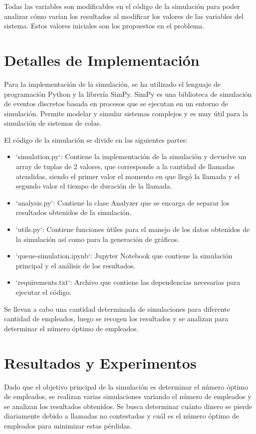 \documentclass{article}
\begin{document}
Todas las variables son modificables en el código de la simulación para poder analizar cómo varían los resultados al modificar los valores de las variables del sistema. Estos valores iniciales son los propuestos en el problema.
\section{Detalles de Implementación}

Para la implementación de la simulación, se ha utilizado el lenguaje de programación Python y la librería SimPy. SimPy es una biblioteca de simulación de eventos discretos basada en procesos que se ejecutan en un entorno de simulación. Permite modelar y simular sistemas complejos y es muy útil para la simulación de sistemas de colas.

El código de la simulación se divide en las siguientes partes:
\begin{itemize}
    \item `simulation.py`: Contiene la implementación de la simulación y devuelve un array de tuplas de 2 valores, que corresponde a la cantidad de llamadas atendidas, siendo el primer valor el momento en que llegó la llamada y el segundo valor el tiempo de duración de la llamada.
    \item `analysis.py`: Contiene la clase Analyzer que se encarga de separar los resultados obtenidos de la simulación.
    \item `utils.py`: Contiene funciones útiles para el manejo de los datos obtenidos de la simulación así como para la generación de gráficos.
    \item `queue-simulation.ipynb`: Jupyter Notebook que contiene la simulación principal y el análisis de los resultados.
    \item `requirements.txt`: Archivo que contiene las dependencias necesarias para ejecutar el código.
\end{itemize}

Se llevan a cabo una cantidad determinada de simulaciones para diferente cantidad de empleados, luego se recogen los resultados y se analizan para determinar el número óptimo de empleados.

\section{Resultados y Experimentos}
Dado que el objetivo principal de la simulación es determinar el número óptimo de empleados, se realizan varias simulaciones variando el número de empleados y se analizan los resultados obtenidos. Se busca determinar cuánto dinero se pierde diariamente debido a llamadas no contestadas y cuál es el número óptimo de empleados para minimizar estas pérdidas.
\end{document}
